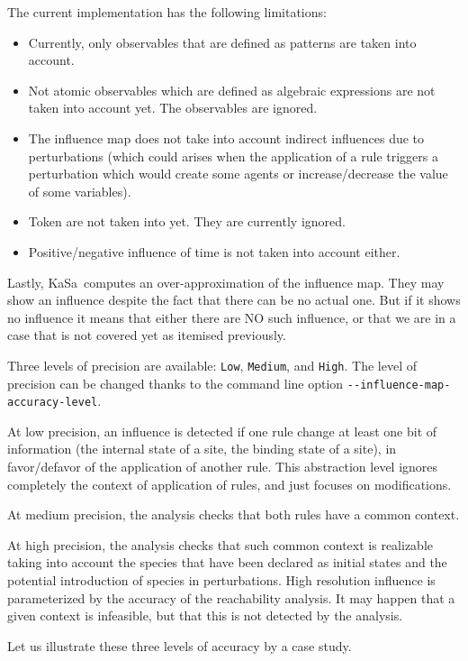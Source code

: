 \documentclass[11pt]{book}
\begin{document}
The current implementation has the following limitations:
\begin{itemize}
\item Currently, only observables that are defined as patterns are taken into account.
\item Not atomic observables which are defined as algebraic expressions are not taken into account yet. The observables are ignored.
\item The influence map does not take into account indirect influences due to perturbations (which could arises when the application of a rule triggers a perturbation which would create some agents or increase/decrease the value of some variables).
\item Token are not taken into yet. They are currently ignored.
\item Positive/negative influence of time is not taken into account either.
\end{itemize}

Lastly, KaSa\ computes an over-approximation of the influence map. They may show an influence despite the fact that there can be no actual one. But if it shows no influence it means that either there are NO such influence, or that we are in a case that is not covered yet as itemised previously.

Three levels of precision are available: \texttt{Low}, \texttt{Medium}, and
\texttt{High}. The level of precision can be changed thanks to the command line option \texttt{-{}-influence-map-accuracy-level}.

At low precision, an influence is detected if one rule change at least one bit of information (the internal state of a site, the binding state of a site), in favor/defavor of the application of another rule. This abstraction level ignores completely the context of application of rules, and just focuses on modifications.

At medium precision, the analysis checks that both rules have a common context.

At high precision, the analysis checks that such common context is realizable taking into account the species that have been declared as initial states
and the potential introduction of species in perturbations. High resolution influence is parameterized by the accuracy of the reachability analysis.
It may happen that a given context is infeasible, but that this is not detected by the analysis.

Let us illustrate these three levels of accuracy by a case study.
\end{document}
